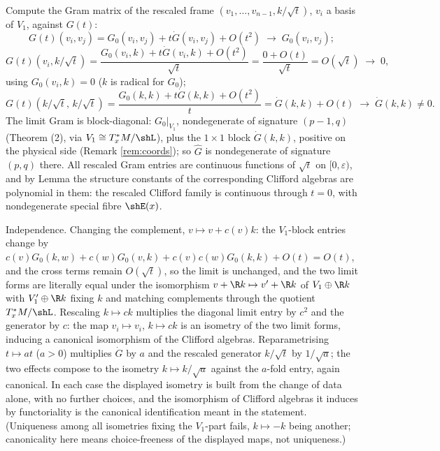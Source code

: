 Compute the Gram matrix of the rescaled frame $(v_1, \dots, v_{n-1}, k/\sqrt{t})$, $v_i$ a basis of $V_1$, against $G(t)$:
\[
G(t)(v_i, v_j) = G_0(v_i,v_j) + t\dot G(v_i,v_j) + O(t^2) \;\longrightarrow\; G_0(v_i,v_j) ;
\]
\[
G(t)(v_i, k/\sqrt{t}) = \frac{G_0(v_i,k) + t\dot G(v_i,k) + O(t^2)}{\sqrt{t}} = \frac{0 + O(t)}{\sqrt{t}} = O(\sqrt{t}) \;\longrightarrow\; 0 ,
\]
using $G_0(v_i, k) = 0$ ($k$ is radical for $G_0$);
\[
G(t)(k/\sqrt{t},\, k/\sqrt{t}) = \frac{G_0(k,k) + t\dot G(k,k) + O(t^2)}{t} = \dot G(k,k) + O(t) \;\longrightarrow\; \dot G(k,k) \neq 0 .
\]
The limit Gram is block-diagonal: $G_0|_{V_1}$, nondegenerate of signature $(p{-}1,q)$ (Theorem (2), via $V_1 \cong T^*_xM/\shL$), plus the $1 \times 1$ block $\dot G(k,k)$, positive on the physical side (Remark \ref{rem:coords}); so $\hat G$ is nondegenerate of signature $(p,q)$ there. All rescaled Gram entries are continuous functions of $\sqrt{t}$ on $[0, \varepsilon)$, and by Lemma  the structure constants of the corresponding Clifford algebras are polynomial in them: the rescaled Clifford family is continuous through $t = 0$, with nondegenerate special fibre $\shE(x)$.

Independence. Changing the complement, $v \mapsto v + c(v)k$: the $V_1$-block entries change by $c(v)G_0(k, w) + c(w)G_0(v,k) + c(v)c(w)G_0(k,k) + O(t) = O(t)$, and the cross terms remain $O(\sqrt t)$, so the limit is unchanged, and the two limit forms are literally equal under the isomorphism $v + \R k \mapsto v' + \R k$ of $V_1 \oplus \R k$ with $V_1' \oplus \R k$ fixing $k$ and matching complements through the quotient $T^*_xM/\shL$. Rescaling $k \mapsto ck$ multiplies the diagonal limit entry by $c^2$ and the generator by $c$: the map $v_i \mapsto v_i$, $k \mapsto ck$ is an isometry of the two limit forms, inducing a canonical isomorphism of the Clifford algebras. Reparametrising $t \mapsto at$ ($a > 0$) multiplies $\dot G$ by $a$ and the rescaled generator $k/\sqrt{t}$ by $1/\sqrt{a}$; the two effects compose to the isometry $k \mapsto k/\sqrt a$ against the $a$-fold entry, again canonical. In each case the displayed isometry is built from the change of data alone, with no further choices, and the isomorphism of Clifford algebras it induces by functoriality is the canonical identification meant in the statement. (Uniqueness among all isometries fixing the $V_1$-part fails, $k \mapsto -k$ being another; canonicality here means choice-freeness of the displayed maps, not uniqueness.)
